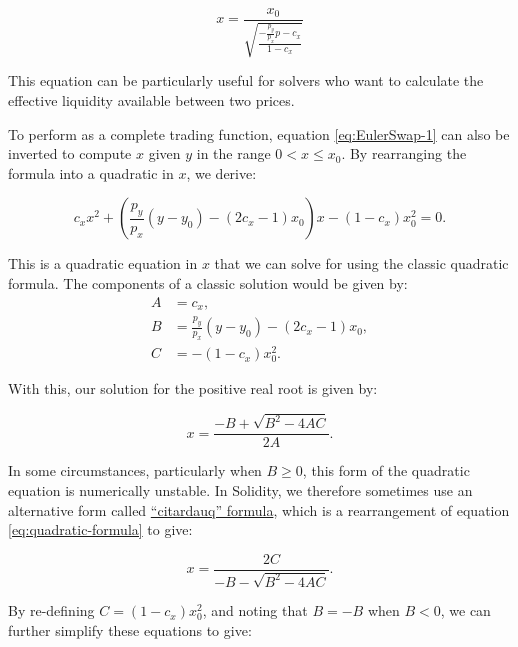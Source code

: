 \documentclass{article}
\begin{document}
\begin{equation}
x 
= 
\frac{x_0}{\sqrt{ \frac{ -\frac{p_y}{p_x} p - c_x }{1 - c_x} } }    
\end{equation}

This equation can be particularly useful for solvers who want to calculate the effective liquidity available between two prices. 

To perform as a complete trading function, equation \eqref{eq:EulerSwap-1} can also be inverted to compute \(x\) given \(y\) in the range \(0 < x \leq x_0\). By rearranging the formula into a quadratic in \(x\), we derive:

\begin{equation}
    \label{eq:EulerSwap-inverse-1}
    c_{x}x^{2} + \left( \frac{p_{y}}{p_{x}} \left( y - y_{0} \right) - \left( 2c_{x} - 1 \right) x_{0} \right) x - \left(1 - c_{x} \right) x_{0}^{2} = 0.
\end{equation}

This is a quadratic equation in $x$ that we can solve for using the classic quadratic formula. The components of a classic solution would be given by:
\begin{align}
    A 
    &= 
    c_x, \\ \nonumber
    B 
    &=
    \frac{p_{y}}{p_{x}} \left( y - y_{0} \right) - \left( 2c_{x} - 1 \right) x_{0}, \\ \nonumber
    C 
    &= - \left(1 - c_{x} \right) x_{0}^{2}. 
\end{align}

With this, our solution for the positive real root is given by:

\begin{equation}
\label{eq:quadratic-formula}
    x
    =
    \frac{-B + \sqrt{B^2 - 4AC}}{2A}.
\end{equation}

In some circumstances, particularly when $B \geq 0$, this form of the quadratic equation is numerically unstable. In Solidity, we therefore sometimes use an alternative form called \href{https://en.wikipedia.org/wiki/Quadratic_formula}{``citardauq'' formula}, which is a rearrangement of equation \eqref{eq:quadratic-formula} to give:

\begin{equation}
\label{eq:citardauq-formula}
    x
    =
    \frac{2C}{-B - \sqrt{B^2 - 4AC}}.
\end{equation}

By re-defining $C = \left(1 - c_{x} \right) x_{0}^{2}$, and noting that $B = -B$ when $B < 0$, we can further simplify these equations to give:
\end{document}
